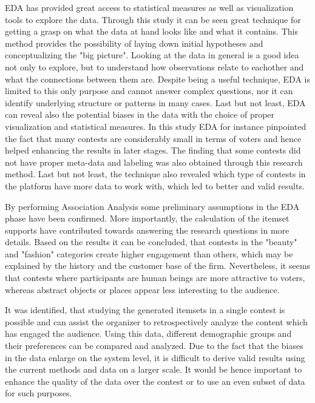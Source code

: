 EDA has provided great access to statistical measures as well as visualization tools to explore the data. Through this study it can be seen great technique for getting a grasp on what the data at hand looks like and what it contains. This method provides the possibility of laying down initial hypotheses and conceptualizing the "big picture". Looking at the data in general is a good idea not only to explore, but to understand how observations relate to eachother and what the connections between them are. Despite being a useful technique, EDA is limited to this only purpose and cannot answer complex questions, nor it can identify underlying structure or patterns in many cases. Last but not least, EDA can reveal also the potential biases in the data with the choice of proper visualization and statistical measures. In this study EDA for instance pinpointed the fact that many contests are considerably small in terms of voters and hence helped enhancing the results in later stages. The finding that some contests did not have proper meta-data and labeling was also obtained through this research method. Last but not least, the technique also revealed which type of contests in the platform have more data to work with, which led to better and valid results. 

By performing Association Analysis some preliminary assumptions in the EDA phase have been confirmed. More importantly, the calculation of the itemset supports have contributed towards answering the research questions in more details. Based on the results it can be concluded, that contests in the "beauty" and "fashion" categories create higher engagement than others, which may be explained by the history and the customer base of the firm. Nevertheless, it seems that contests where participants are human beings are more attractive to voters, whereas abstract objects or places appear less interesting to the audience. 

It was identified, that studying the generated itemsets in a single contest is possible and can assist the organizer to retrospectively analyze the content which has engaged the audience. Using this data, different demographic groups and their preferences can be compared and analyzed. Due to the fact that the biases in the data enlarge on the system level, it is difficult to derive valid results using the current methods and data on a larger scale. It would be hence important to enhance the quality of the data over the contest or to use an even subset of data for such purposes.

